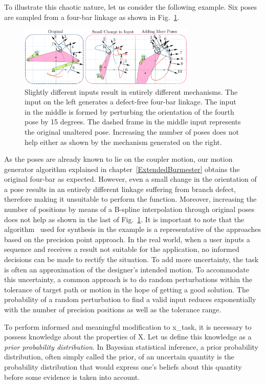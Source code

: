 To illustrate this chaotic nature, let us consider the following example.
Six poses are sampled from a four-bar linkage as shown in Fig.~\ref{fig_chaotic_motiongen}.
\begin{figure}[tbh]
\centering
\includegraphics[width=0.75\textwidth]{jmd-19/figure/motiongen-chaos.eps}
  \caption{Slightly different inputs result in entirely different mechanisms. The input on the left generates a defect-free four-bar linkage. The input in the middle is formed by perturbing the orientation of the fourth pose by 15 degrees. The dashed frame in the middle input represents the original unaltered pose. Increasing the number of poses does not help either as shown by the mechanism generated on the right.}
\label{fig_chaotic_motiongen}
\end{figure}
As the poses are already known to lie on the coupler motion, our motion generator algorithm\cite{shrinathpurwar2017} explained in chapter~\ref{ExtendedBurmester} obtains the original four-bar as expected.
However, even a small change in the orientation of a pose results in an entirely different linkage suffering from branch defect, therefore making it unsuitable to perform the function.
Moreover, increasing the number of positions by means of a B-spline interpolation through original poses does not help as shown in the last of Fig.~\ref{fig_chaotic_motiongen}.
It is important to note that the algorithm~\cite{shrinathpurwar2017} used for synthesis in the example is a representative of the approaches based on the precision point approach.
In the real world, when a user inputs a sequence and receives a result not suitable for the application, no informed decisions can be made to rectify the situation.
To add more uncertainty, the task is often an approximation of the designer's intended motion.
To accommodate this uncertainty, a common approach is to do random perturbations within the tolerance of target path or motion in the hope of getting a good solution.
The probability of a random perturbation to find a valid input reduces exponentially with the number of precision positions as well as the tolerance range.

To perform informed and meaningful modification to \ac{x_task}, it is necessary to possess knowledge about the properties of \ac{X}. Let us define this knowledge as a \emph{prior probability distribution}. In Bayesian statistical inference, a prior probability distribution, often simply called the \ac{prior}, of an uncertain quantity is the probability distribution that would express one's beliefs about this quantity before some evidence is taken into account.


